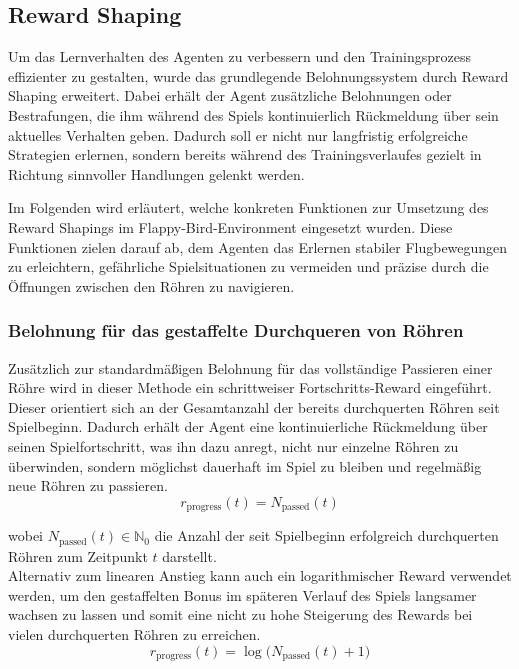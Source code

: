 \documentclass[conference]{IEEEtran}
\begin{document}
\subsection{Reward Shaping}\label{reward_shaping}
Um das Lernverhalten des Agenten zu verbessern und den Trainingsprozess effizienter zu gestalten, wurde das grundlegende Belohnungssystem durch Reward Shaping erweitert. Dabei erhält der Agent zusätzliche Belohnungen oder Bestrafungen, die ihm während des Spiels kontinuierlich Rückmeldung über sein aktuelles Verhalten geben. Dadurch soll er nicht nur langfristig erfolgreiche Strategien erlernen, sondern bereits während des Trainingsverlaufes gezielt in Richtung sinnvoller Handlungen gelenkt werden.

Im Folgenden wird erläutert, welche konkreten Funktionen zur Umsetzung des Reward Shapings im Flappy-Bird-Environment eingesetzt wurden. Diese Funktionen zielen darauf ab, dem Agenten das Erlernen stabiler Flugbewegungen zu erleichtern, gefährliche Spielsituationen zu vermeiden und präzise durch die Öffnungen zwischen den Röhren zu navigieren.

\subsubsection{Belohnung für das gestaffelte Durchqueren von Röhren}\label{reward_shaping_first}
Zusätzlich zur standardmäßigen Belohnung für das vollständige Passieren einer Röhre wird in dieser Methode ein schrittweiser Fortschritts-Reward eingeführt. Dieser orientiert sich an der Gesamtanzahl der bereits durchquerten Röhren seit Spielbeginn. Dadurch erhält der Agent eine kontinuierliche Rückmeldung über seinen Spielfortschritt, was ihn dazu anregt, nicht nur einzelne Röhren zu überwinden, sondern möglichst dauerhaft im Spiel zu bleiben und regelmäßig neue Röhren zu passieren.
\begin{equation}
	r_{\text{progress}}(t) = N_{\text{passed}}(t)
\end{equation}

wobei \( N_{\text{passed}}(t) \in \mathbb{N}_0 \) die Anzahl der seit Spielbeginn erfolgreich durchquerten Röhren zum Zeitpunkt \( t \) darstellt.\\

Alternativ zum linearen Anstieg kann auch ein logarithmischer Reward verwendet werden, um den gestaffelten Bonus im späteren Verlauf des Spiels langsamer wachsen zu lassen und somit eine nicht zu hohe Steigerung des Rewards bei vielen durchquerten Röhren zu erreichen.
\begin{equation}
	r_{\text{progress}}(t) = \log\big(N_{\text{passed}}(t) + 1\big)
\end{equation}
\end{document}
